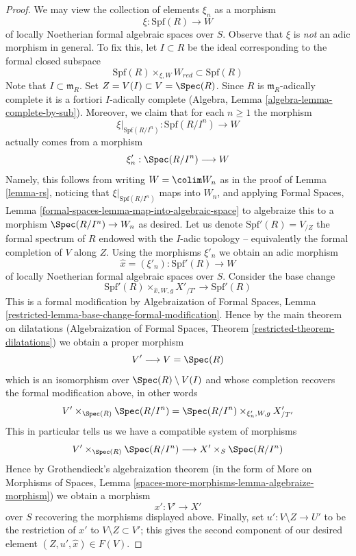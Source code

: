 \begin{proof}
\medskip\noindent
We may view the collection of elements $\xi_n$ as a morphism
$$
\xi : \text{Spf}(R) \longrightarrow W
$$
of locally Noetherian formal algebraic spaces over $S$. Observe that $\xi$
is {\it not} an adic morphism in general. To fix this, let $I \subset R$
be the ideal corresponding to the formal closed subspace
$$
\text{Spf}(R) \times_{\xi, W} W_{red} \subset \text{Spf}(R)
$$
Note that $I \subset \mathfrak m_R$. Set $Z = V(I) \subset V = \Spec(R)$.
Since $R$ is $\mathfrak m_R$-adically complete it is a fortiori
$I$-adically complete (Algebra, Lemma \ref{algebra-lemma-complete-by-sub}).
Moreover, we claim that for each $n \geq 1$ the morphism
$$
\xi|_{\text{Spf}(R/I^n)} :
\text{Spf}(R/I^n)
\longrightarrow
W
$$
actually comes from a morphism
$$
\xi'_n :  \Spec(R/I^n) \longrightarrow W
$$
Namely, this follows from writing $W = \colim W_n$ as in the
proof of Lemma \ref{lemma-rs}, noticing that $\xi|_{\text{Spf}(R/I^n)}$
maps into $W_n$, and applying Formal Spaces, Lemma
\ref{formal-spaces-lemma-map-into-algebraic-space}
to algebraize this to a morphism $\Spec(R/I^n) \to W_n$
as desired. Let us denote $\text{Spf}'(R) = V_{/Z}$ the formal spectrum
of $R$ endowed with the $I$-adic topology -- equivalently the formal
completion of $V$ along $Z$. Using the morphisms
$\xi'_n$ we obtain an adic morphism
$$
\hat x = (\xi'_n) : \text{Spf}'(R) \longrightarrow W
$$
of locally Noetherian formal algebraic spaces over $S$.
Consider the base change
$$
\text{Spf}'(R) \times_{\hat x, W, g} X'_{/T'} \longrightarrow \text{Spf}'(R)
$$
This is a formal modification by
Algebraization of Formal Spaces, Lemma
\ref{restricted-lemma-base-change-formal-modification}.
Hence by the main theorem on dilatations
(Algebraization of Formal Spaces, Theorem \ref{restricted-theorem-dilatations})
we obtain a proper morphism
$$
V' \longrightarrow V = \Spec(R)
$$
which is an isomorphism over $\Spec(R) \setminus V(I)$ and
whose completion recovers the formal modification above, in other words
$$
V' \times_{\Spec(R)} \Spec(R/I^n) =
\Spec(R/I^n) \times_{\xi'_n, W, g} X'_{/T'}
$$
This in particular tells us we have a compatible system of morphisms
$$
V' \times_{\Spec(R)} \Spec(R/I^n) \longrightarrow X' \times_S \Spec(R/I^n)
$$
Hence by Grothendieck's algebraization theorem (in the form of
More on Morphisms of Spaces, Lemma
\ref{spaces-more-morphisms-lemma-algebraize-morphism})
we obtain a morphism
$$
x' : V' \to X'
$$
over $S$ recovering the morphisms displayed above. Finally,
set $u' : V \setminus Z \to U'$ to be the restriction of $x'$ to
$V \setminus Z \subset V'$; this gives the second component of our
desired element $(Z, u', \hat x) \in F(V)$.
\end{proof}

